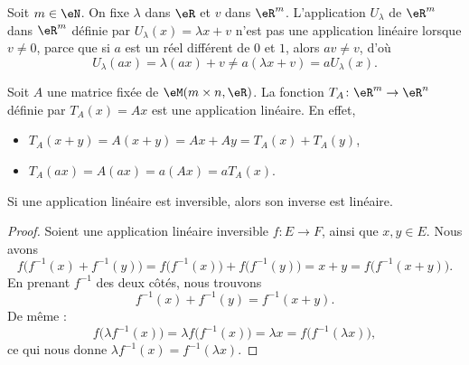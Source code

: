 \begin{example}     \label{ex_affine}
	Soit \( m\in\eN\). On fixe \( \lambda\) dans \( \eR\) et \( v\) dans \( \eR^m\). L'application \( U_{\lambda}\) de \( \eR^m\) dans \( \eR^m\) définie par \( U_{\lambda}(x)=\lambda x+v\) n'est pas une application linéaire lorsque \( v \neq 0 \), parce que si \( a \) est un réel différent de \(0 \) et \( 1 \), alors \( av \neq v \), d'où
	\[
		U_{\lambda}(ax)=\lambda(ax)+v\neq a(\lambda x+v) =a U_{\lambda}(x).
	\]
\end{example}

\begin{example}     \label{exampleT_A}
	Soit \( A\) une matrice fixée de \( \eM(m\times n, \eR)\). La fonction \( T_A\colon \eR^m\to \eR^n\) définie par \( T_A(x)=Ax\) est une application linéaire. En effet,
	\begin{itemize}
		\item \( T_A(x+y) = A(x+y)= Ax + Ay = T_A(x)+T_A(y)\),
		\item \( T_A(ax)  = A(ax) = a(Ax)   = a T_A(x)\).
	\end{itemize}
\end{example}

\begin{lemma}       \label{LEMooLGEHooVEEoiU}
	Si une application linéaire est inversible, alors son inverse est linéaire.
\end{lemma}

\begin{proof}
	Soient une application linéaire inversible \( f\colon E\to F\), ainsi que \( x,y\in E\). Nous avons
	\begin{equation}
		f\big( f^{-1}(x)+f^{-1}(y) \big)=f\big( f^{-1}(x) \big)+f\big( f^{-1}(y) \big)=x+y=f\big( f^{-1}(x+y) \big).
	\end{equation}
	En prenant \( f^{-1}\) des deux côtés, nous trouvons
	\begin{equation}
		f^{-1}(x)+f^{-1}(y)=f^{-1}(x+y).
	\end{equation}
	De même :
	\begin{equation}
		f\big( \lambda f^{-1}(x) \big)=\lambda f\big( f^{-1}(x) \big)=\lambda x=f\big( f^{-1}(\lambda x) \big),
	\end{equation}
	ce qui nous donne \( \lambda f^{-1}(x)=f^{-1}(\lambda x)\).
\end{proof}


